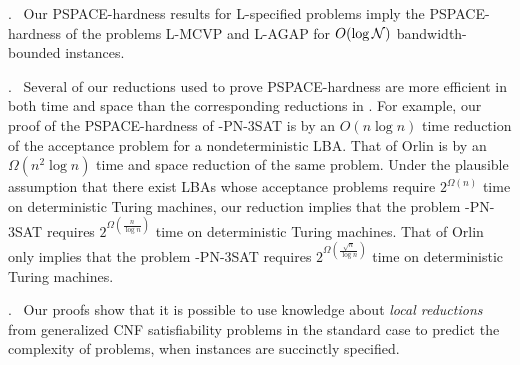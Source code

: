 \smallskip
{}.~
Our {\sf PSPACE-}hardness results for {\sf L-}specified
problems imply the {\sf PSPACE-}hardness of the problems 
{\sf L-MCVP} and {\sf L-AGAP} for $O(\log {\cal N})$ 
bandwidth-bounded instances.

\smallskip
{}.~
Several of our  reductions  used to prove {\sf PSPACE-}hardness
are more  efficient in both   time  and space than  the  corresponding
reductions in \cite{Or82a,LW92}. For example,   our proof of the  {\sf
PSPACE-}hardness  of  {-PN-3SAT}  is   by an  $O(n\log n)$  time
reduction of the acceptance problem  for a nondeterministic {\sf LBA}.
That of Orlin  \cite{Or82a} is  by  an $\Omega(n^2 \log n)$  time  and
space reduction  of the same  problem. Under the  plausible assumption
that  there exist   {\sf  LBA}s   whose acceptance  problems   require
$2^{\Omega(n)}$ time  on deterministic Turing machines,  our reduction
implies    that     the    problem     {-PN-3SAT}     requires
$2^{\Omega(\frac{n}{\log    n})}$   time  on   deterministic    Turing
machines. That of Orlin only  implies that the problem {-PN-3SAT}
requires   $2^{\Omega(\frac{\sqrt{n}}{\log n})}$ time on deterministic
Turing machines.

\smallskip
{}.~
Our proofs show that it is possible to use knowledge 
about {\em local reductions} from generalized {\sf CNF} satisfiability problems
in the standard case to predict the complexity of problems, when instances
are succinctly specified. 

